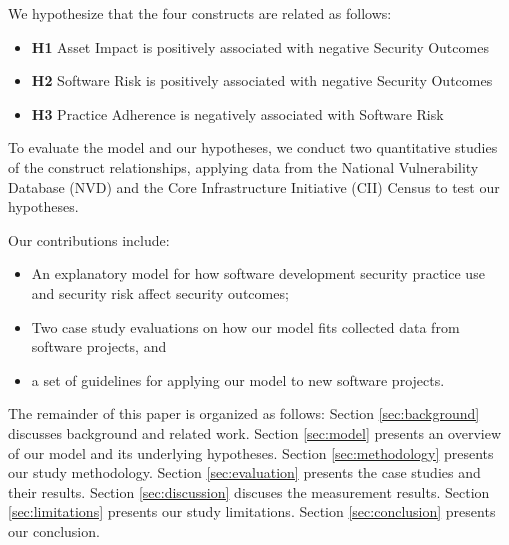 We hypothesize that the four constructs are related as follows:
\begin{itemize}
	\item \textbf{H1} Asset Impact is positively associated with negative Security Outcomes
	\item \textbf{H2} Software Risk is positively associated with negative Security Outcomes
	\item \textbf{H3} Practice Adherence is negatively associated with Software Risk 	
\end{itemize}
	
To evaluate the model and our hypotheses, we conduct two quantitative studies of the construct relationships, applying data from the National Vulnerability Database (NVD) and the Core Infrastructure Initiative (CII) Census to test our hypotheses.
  
Our contributions include:
\begin{itemize}
\item An explanatory model for how software development security practice use and security risk affect security outcomes;
\item Two case study evaluations on how our model fits collected data from software projects, and
\item a set of guidelines for applying our model to new software projects. 
\end{itemize}
The remainder of this paper is organized as follows:  Section \ref{sec:background} discusses background and related work. Section \ref{sec:model} presents an overview of our model and its underlying hypotheses. Section \ref{sec:methodology} presents our study methodology. Section \ref{sec:evaluation} presents the case studies and their results. Section \ref{sec:discussion} discuses the measurement results. Section \ref{sec:limitations} presents our study limitations. Section \ref{sec:conclusion} presents our conclusion.